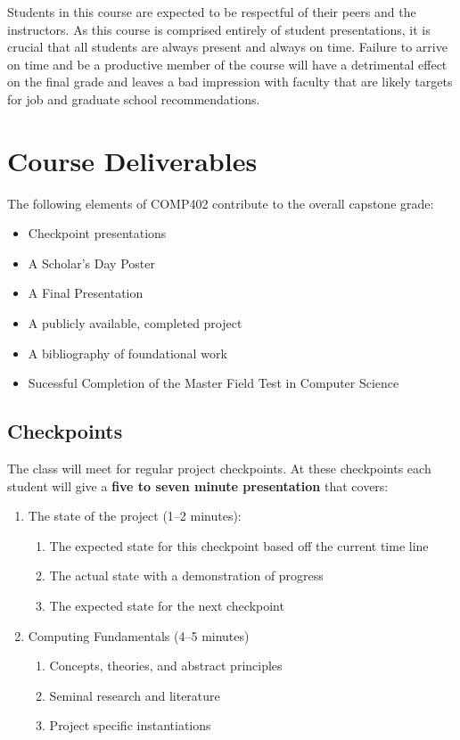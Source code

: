 \documentclass[]{article}
\begin{document}
Students in this course are expected to be respectful of their peers and the instructors. As this course is comprised entirely of student presentations, it is crucial that all students are always present and always on time.  Failure to arrive on time and be a productive member of the course will have a detrimental effect on the final grade and leaves a bad impression with faculty that are likely targets for job and graduate school recommendations.

\section{Course Deliverables}

The following elements of COMP402 contribute to the overall capstone grade:
\begin{itemize}
\item Checkpoint presentations
\item A Scholar's Day Poster
\item A Final Presentation
\item A publicly available, completed project
\item A bibliography of foundational work
\item Sucessful Completion of the Master Field Test in Computer Science
\end{itemize}


\subsection{Checkpoints}

The class will meet for regular project checkpoints. At these checkpoints each student will give a \textbf{five to seven minute presentation} that covers:
\begin{enumerate}
\item The state of the project (1--2 minutes):
\begin{enumerate}
\item The expected state for this checkpoint based off the current time line
\item The actual state with a demonstration of progress
\item The expected state for the next checkpoint
\end{enumerate}
\item Computing Fundamentals (4--5 minutes)
\begin{enumerate}
\item Concepts, theories, and abstract principles
\item Seminal research and literature
\item Project specific instantiations
\end{enumerate}
\end{enumerate}
\end{document}
